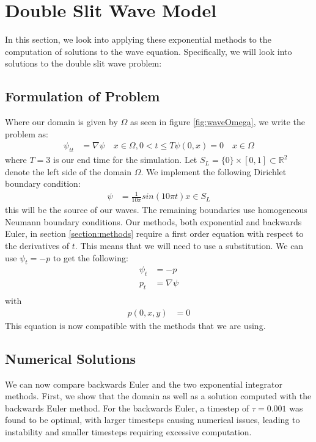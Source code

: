 \section{Double Slit Wave Model}

In this section, we look into applying these exponential methods to the computation of solutions to the wave equation.
Specifically, we will look into solutions to the double slit wave problem:

\subsection{Formulation of Problem}
Where our domain is given by $\Omega$ as seen in figure \ref{fig:waveOmega}, we write the problem as:
\begin{align*}
    \psi_{tt} &= \nabla \psi \quad x \in \Omega, 0<t\leq T
    \psi(0,x) = 0 \quad x \in \Omega
\end{align*}
where $T=3$ is our end time for the simulation.
Let $S_L = \{0\} \times [0,1] \subset \mathbb{R}^2$ denote the left side of the domain $\Omega$.
We implement the following Dirichlet boundary condition:
\begin{align*}
    \psi &= \frac{1}{10\pi} sin(10\pi t) x \in S_L
\end{align*}
this will be the source of our waves.
The remaining boundaries use homogeneous Neumann boundary conditions.
Our methods, both exponential and backwards Euler, in section \ref{section:methods} require a first order equation with respect to the derivatives of $t$.
This means that we will need to use a substitution.
We can use $\psi_t = -p$ to get the following:
\begin{align*}
    \psi_t &= -p\\
    p_t &= \nabla \psi\\
\end{align*}
with
\begin{align*}
    p(0,x,y) &= 0
\end{align*}
This equation is now compatible with the methods that we are using.

\subsection{Numerical Solutions}
We can now compare backwards Euler and the two exponential integrator methods.
First, we show that the domain as well as a solution computed with the backwards Euler method.
For the backwards Euler, a timestep of $\tau = 0.001$ was found to be optimal, with larger timesteps causing numerical issues, leading to instability and smaller timesteps requiring excessive computation.

